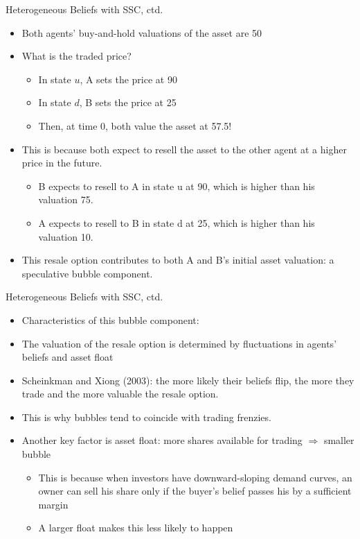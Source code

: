 \documentclass[aspectratio=169, 11pt]{beamer}
\begin{document}
\begin{frame}{Heterogeneous Beliefs with SSC, ctd.}
\begin{itemize}
\item Both agents' buy-and-hold valuations of the asset are 50
\item What is the traded price?
  \begin{itemize}
  \item In state $u$, A sets the price at 90
  \item In state $d$, B sets the price at 25
  \item Then, at time 0, both value the asset at 57.5!
  \end{itemize}
\item This is because both expect to resell the asset to the other agent at a higher price in the future.
  \begin{itemize}
\item B expects to resell to A in state u at 90, which is higher than his valuation 75.
\item A expects to resell to B in state d at 25, which is higher than his valuation 10.
  \end{itemize} 
\item This resale option contributes to both A and B's initial asset valuation: a speculative bubble component.
\end{itemize}
\end{frame}

\begin{frame}{Heterogeneous Beliefs with SSC, ctd.}
\begin{itemize}
\item Characteristics of this bubble component:
\item The valuation of the resale option is determined by fluctuations in agents' beliefs and asset float
\item Scheinkman and Xiong (2003): the more likely their beliefs flip, the more they trade and the more valuable the resale option. 
\item This is why bubbles tend to coincide with trading frenzies. 
\item Another key factor is asset float: more shares available for trading $\Rightarrow$ smaller bubble
\begin{itemize}
\item This is because when investors have downward-sloping demand curves, an owner can sell his share only if the buyer's belief passes his by a sufficient margin 
\item A larger float makes this less likely to happen 
\end{itemize} 
\end{itemize}
\end{frame}
\end{document}
